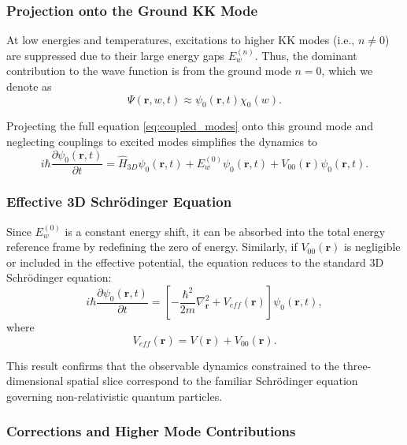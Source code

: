\documentclass[12pt]{article}
\begin{document}
\subsubsection*{Projection onto the Ground KK Mode}

At low energies and temperatures, excitations to higher KK modes (i.e., \(n \neq 0\)) are suppressed due to their large energy gaps \(E_w^{(n)}\). Thus, the dominant contribution to the wave function is from the ground mode \(n=0\), which we denote as
\begin{equation}
    \Psi(\mathbf{r}, w, t) \approx \psi_0(\mathbf{r}, t) \chi_0(w).
\end{equation}

Projecting the full equation \eqref{eq:coupled_modes} onto this ground mode and neglecting couplings to excited modes simplifies the dynamics to
\begin{equation}
    i \hbar \frac{\partial \psi_0(\mathbf{r}, t)}{\partial t} = \hat{H}_{3D} \psi_0(\mathbf{r}, t) + E_w^{(0)} \psi_0(\mathbf{r}, t) + V_{00}(\mathbf{r}) \psi_0(\mathbf{r}, t).
    \label{eq:ground_mode_schrodinger}
\end{equation}

\subsubsection*{Effective 3D Schrödinger Equation}

Since \(E_w^{(0)}\) is a constant energy shift, it can be absorbed into the total energy reference frame by redefining the zero of energy. Similarly, if \(V_{00}(\mathbf{r})\) is negligible or included in the effective potential, the equation reduces to the standard 3D Schrödinger equation:
\begin{equation}
    i \hbar \frac{\partial \psi_0(\mathbf{r}, t)}{\partial t} = \left[-\frac{\hbar^2}{2m} \nabla_{\mathbf{r}}^2 + V_{eff}(\mathbf{r}) \right] \psi_0(\mathbf{r}, t),
    \label{eq:standard_3d_schrodinger}
\end{equation}
where
\begin{equation}
    V_{eff}(\mathbf{r}) = V(\mathbf{r}) + V_{00}(\mathbf{r}).
\end{equation}

This result confirms that the observable dynamics constrained to the three-dimensional spatial slice correspond to the familiar Schrödinger equation governing non-relativistic quantum particles.

\subsubsection*{Corrections and Higher Mode Contributions}
\end{document}
